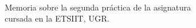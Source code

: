 \documentclass{memoria}
\begin{document}
\newpage
\begin{center}
\end{center}
\vspace{3in}
\begin{center}
\LARGE{\thetitle}\\
\end{center}

\vspace{2in}

\begin{flushright}
Memoria sobre la segunda práctica de la asignatura \curso \\ cursada en la ETSIIT, UGR.
\\
\vspace{0.2in}

\theauthor


\end{flushright}

\vfill
\begin{center}
\end{center}

\newpage

\pagestyle{plain} %
\tableofcontents

\listoffigures

\listoftables


\newpage






\nocite{*}


\end{document}
